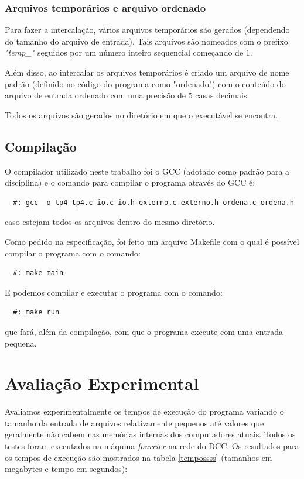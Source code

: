 \documentclass[12pt]{article}
\begin{document}
\subsubsection{Arquivos temporários e arquivo ordenado}
Para fazer a intercalação, vários arquivos temporários são gerados (dependendo do tamanho do arquivo
de entrada). Tais arquivos são nomeados com o prefixo \textit{"temp\_"} seguidos por um número inteiro
sequencial começando de $1$.

Além disso, ao intercalar os arquivos temporários é criado um arquivo de nome padrão (definido no código
do programa como "ordenado") com o conteúdo do arquivo de entrada ordenado com uma precisão de 5 casas decimais.

Todos os arquivos são gerados no diretório em que o executável se encontra.

\subsection{Compilação}
O compilador utilizado neste trabalho foi o GCC (adotado como padrão para a disciplina) e 
o comando para compilar o programa através do GCC é:
\begin{verbatim}
  #: gcc -o tp4 tp4.c io.c io.h externo.c externo.h ordena.c ordena.h
\end{verbatim}
caso estejam todos os arquivos dentro do mesmo diretório.

Como pedido na especificação, foi feito um arquivo Makefile com o qual é possível compilar
o programa com o comando: 
\begin{verbatim}
  #: make main
\end{verbatim}

E podemos compilar e executar o programa com o comando:
\begin{verbatim}
  #: make run
\end{verbatim}
que fará, além da compilação, com que o programa execute com uma entrada pequena.

\section{Avaliação Experimental}
\label{avaliacao_experimental}

Avaliamos experimentalmente os tempos de execução do programa variando o tamanho da entrada
de arquivos relativamente pequenos até valores que geralmente não cabem nas memórias internas 
dos computadores atuais. Todos os testes foram executados na máquina \textit{fourrier} na rede 
do DCC. Os resultados para os tempos de execução são mostrados na tabela \ref{tempossss} (tamanhos em megabytes 
e tempo em segundos):
\end{document}
